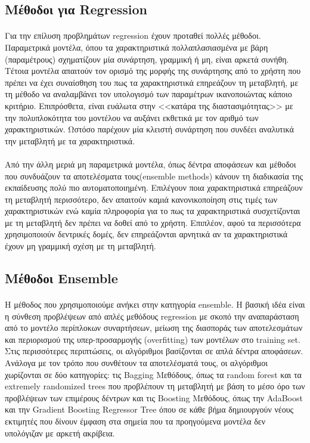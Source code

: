 \subsection{Μέθοδοι για Regression}
\paragraph{}
Για την επίλυση προβλημάτων regression έχουν προταθεί πολλές μέθοδοι. Παραμετρικά μοντέλα, όπου τα χαρακτηριστικά πολλαπλασιασμένα με βάρη (παραμέτρους) σχηματίζουν μία συνάρτηση, γραμμική ή μη, είναι αρκετά συνήθη. Τέτοια μοντέλα απαιτούν τον ορισμό της μορφής της συνάρτησης από το χρήστη που πρέπει να έχει συναίσθηση του πως τα χαρακτηριστικά επηρεάζουν τη μεταβλητή, με τη μέθοδο να αναλαμβάνει τον υπολογισμό των παραμέτρων ικανοποιώντας κάποιο κριτήριο. Επιπρόσθετα, είναι ευάλωτα στην <<κατάρα της διαστασιμότητας>> με την πολυπλοκότητα του μοντέλου να αυξάνει εκθετικά με τον αριθμό των χαρακτηριστικών. Ωστόσο παρέχουν μία κλειστή συνάρτηση που συνδέει αναλυτικά την μεταβλητή με τα χαρακτηριστικά.
\paragraph{}
Από την άλλη μεριά μη παραμετρικά μοντέλα, όπως δέντρα αποφάσεων και μέθοδοι που συνδυάζουν τα αποτελέσματα τους(ensemble methods) κάνουν τη διαδικασία της εκπαίδευσης πολύ πιο αυτοματοποιημένη. Επιλέγουν ποια χαρακτηριστικά επηρεάζουν τη μεταβλητή περισσότερο, δεν απαιτούν καμιά κανονικοποίηση στις τιμές των χαρακτηριστικών ενώ καμία πληροφορία για το πως τα χαρακτηριστικά συσχετίζονται με τη μεταβλητή δεν πρέπει να δοθεί από το χρήστη. Επιπλέον, αφού τα περισσότερα χρησιμοποιούν δεντρικές δομές, δεν επηρεάζονται αρνητικά αν τα χαρακτηριστικά έχουν μη γραμμική σχέση με τη μεταβλητή.
\subsection{Μέθοδοι Ensemble}
\paragraph{}
Η μέθοδος που χρησιμοποιούμε ανήκει στην κατηγορία ensemble. Η βασική ιδέα είναι η σύνθεση προβλέψεων από απλές μεθόδους regression με σκοπό την αναπαράσταση από το μοντέλο περίπλοκων συναρτήσεων, μείωση της διασποράς των αποτελεσμάτων και περιορισμού της υπερ-προσαρμογής (overfitting) των μοντέλων στο training set. Στις περισσότερες περιπτώσεις, οι αλγόριθμοι βασίζονται σε απλά δέντρα αποφάσεων. Ανάλογα με τον τρόπο που συνθέτουν τα αποτελέσματά τους, οι αλγόριθμοι χωρίζονται σε δύο κατηγορίες: τις Bagging Μεθόδους, όπως τα  random forest και τα extremely randomized trees που προβλέπουν τη μεταβλητή με βάση το μέσο όρο των προβλέψεων των επιμέρους δέντρων και τις Boosting Μεθόδους, όπως την AdaBoost και την Gradient Boosting Regressor Tree όπου σε κάθε βήμα δημιουργούν νέους εκτιμητές που δίνουν έμφαση στα σημεία που τα προηγούμενα μοντέλα δεν υπολόγιζαν με αρκετή ακρίβεια. 

